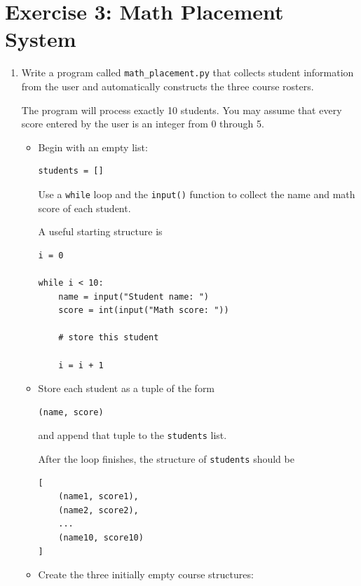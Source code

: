 \documentclass{article}
\begin{document}
\section{Exercise 3: Math Placement System}

\begin{enumerate}

\item Write a program called
\texttt{math\_placement.py} that collects student information
from the user and automatically constructs the three course
rosters.

The program will process exactly 10 students.  You may
assume that every score entered by the user is an integer
from 0 through 5.

\begin{itemize}

\item Begin with an empty list:

\begin{verbatim}
students = []
\end{verbatim}

Use a \texttt{while} loop and the \texttt{input()} function
to collect the name and math score of each student.

A useful starting structure is

\begin{verbatim}
i = 0

while i < 10:
    name = input("Student name: ")
    score = int(input("Math score: "))

    # store this student

    i = i + 1
\end{verbatim}

\item Store each student as a tuple of the form

\begin{verbatim}
(name, score)
\end{verbatim}

and append that tuple to the \texttt{students} list.

After the loop finishes, the structure of
\texttt{students} should be

\begin{verbatim}
[
    (name1, score1),
    (name2, score2),
    ...
    (name10, score10)
]
\end{verbatim}

\item Create the three initially empty course structures:


\end{itemize}
\end{enumerate}
\end{document}
